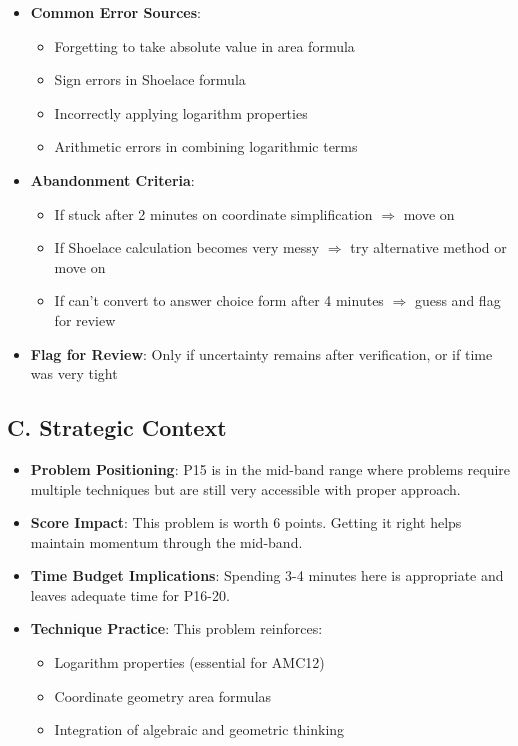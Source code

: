 \documentclass[12pt]{article}
\begin{document}
\begin{competitionbox}
\begin{itemize}[leftmargin=*]
    \item \textbf{Common Error Sources}:
    \begin{itemize}
        \item Forgetting to take absolute value in area formula
        \item Sign errors in Shoelace formula
        \item Incorrectly applying logarithm properties
        \item Arithmetic errors in combining logarithmic terms
    \end{itemize}
    
    \item \textbf{Abandonment Criteria}: 
    \begin{itemize}
        \item If stuck after 2 minutes on coordinate simplification $\Rightarrow$ move on
        \item If Shoelace calculation becomes very messy $\Rightarrow$ try alternative method or move on
        \item If can't convert to answer choice form after 4 minutes $\Rightarrow$ guess and flag for review
    \end{itemize}
    
    \item \textbf{Flag for Review}: Only if uncertainty remains after verification, or if time was very tight
\end{itemize}

\subsection*{C. Strategic Context}
\begin{itemize}[leftmargin=*]
    \item \textbf{Problem Positioning}: P15 is in the mid-band range where problems require multiple techniques but are still very accessible with proper approach.
    
    \item \textbf{Score Impact}: This problem is worth 6 points. Getting it right helps maintain momentum through the mid-band.
    
    \item \textbf{Time Budget Implications}: Spending 3-4 minutes here is appropriate and leaves adequate time for P16-20.
    
    \item \textbf{Technique Practice}: This problem reinforces:
    \begin{itemize}
        \item Logarithm properties (essential for AMC12)
        \item Coordinate geometry area formulas
        \item Integration of algebraic and geometric thinking
    \end{itemize}
\end{itemize}
\end{competitionbox}
\end{document}
